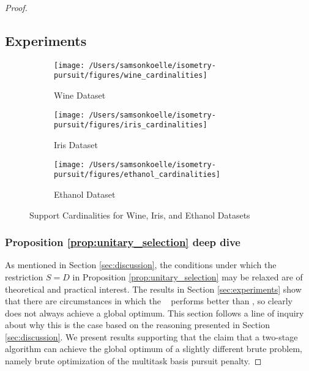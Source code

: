\begin{proof}
\subsection{Experiments}
\label{sec:sup_exp}

\begin{figure}[H]
    \centering
    \begin{subfigure}[b]{0.3\textwidth}
        \centering
        \texttt{[image: /Users/samsonkoelle/isometry-pursuit/figures/wine\_cardinalities]}
        \caption{Wine Dataset}
        \label{fig:wine_cardinalities}
    \end{subfigure}
    \hfill
    \begin{subfigure}[b]{0.3\textwidth}
        \centering
        \texttt{[image: /Users/samsonkoelle/isometry-pursuit/figures/iris\_cardinalities]}
        \caption{Iris Dataset}
        \label{fig:iris_cardinalities}
    \end{subfigure}
    \hfill
    \begin{subfigure}[b]{0.3\textwidth}
        \centering
        \texttt{[image: /Users/samsonkoelle/isometry-pursuit/figures/ethanol\_cardinalities]}
        \caption{Ethanol Dataset}
        \label{fig:ethanol_cardinalities}
    \end{subfigure}
    \caption{Support Cardinalities for Wine, Iris, and Ethanol Datasets}
    \label{fig:support_cardinalities}
\end{figure}

\subsubsection{Proposition \ref{prop:unitary_selection} deep dive}

As mentioned in Section \ref{sec:discussion}, the conditions under which the restriction $S=D$ in Proposition \ref{prop:unitary_selection} may be relaxed are of theoretical and practical interest.
The results in Section \ref{sec:experiments} show that there are circumstances in which the \greedy~ performs better than \tsip, so clearly \tsip~ does not always achieve a global optimum.
This section follows a line of inquiry about why this is the case based on the reasoning presented in Section \ref{sec:discussion}.
We present results supporting that the claim that a two-stage algorithm can achieve the global optimum of a slightly different brute problem, namely brute optimization of the multitask basis pursuit penalty.


\end{proof}
